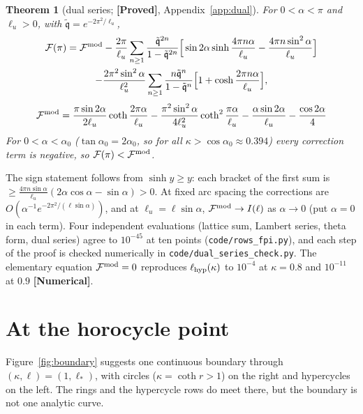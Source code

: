 \documentclass[11pt]{article}
\newtheorem{theorem}{Theorem}[section]
\theoremstyle{definition}
\theoremstyle{remark}
\newcommand{\st}[1]{\textbf{[#1]}}
\begin{document}
\begin{theorem}[dual series; \st{Proved}, Appendix~\ref{app:dual}]\label{thm:dual}
For $0<\alpha<\pi$ and $\ell_u>0$, with $\tilde{\mathfrak q}=e^{-2\pi^2/\ell_u}$,
\begin{multline*}
\mathcal F(\pi)=\mathcal F^{\rm mod}-\frac{2\pi}{\ell_u}\sum_{n\ge1}\frac{\tilde{\mathfrak q}^{2n}}{1-\tilde{\mathfrak q}^{2n}}\Big[\sin2\alpha\sinh\frac{4\pi n\alpha}{\ell_u}-\frac{4\pi n\sin^2\alpha}{\ell_u}\Big]\\
-\frac{2\pi^2\sin^2\alpha}{\ell_u^2}\sum_{n\ge1}\frac{n\tilde{\mathfrak q}^n}{1-\tilde{\mathfrak q}^n}\Big[1+\cosh\frac{2\pi n\alpha}{\ell_u}\Big],
\end{multline*}
\[
\mathcal F^{\rm mod}=\frac{\pi\sin2\alpha}{2\ell_u}\coth\frac{2\pi\alpha}{\ell_u}-\frac{\pi^2\sin^2\alpha}{4\ell_u^2}\coth^2\frac{\pi\alpha}{\ell_u}-\frac{\alpha\sin2\alpha}{\ell_u}-\frac{\cos2\alpha}4
\]
For $0<\alpha<\alpha_0$ ($\tan\alpha_0=2\alpha_0$, so for all $\kappa>\cos\alpha_0\approx0.394$) every correction term is negative,
so $\mathcal F(\pi)<\mathcal F^{\rm mod}$.
\end{theorem}
The sign statement follows from $\sinh y\ge y$: each bracket of the first sum is $\ge\frac{4\pi n\sin\alpha}{\ell_u}(2\alpha\cos\alpha-\sin\alpha)>0$.
At fixed arc spacing the corrections are $O(\alpha^{-1}e^{-2\pi^2/(\ell\sin\alpha)})$, and at $\ell_u=\ell\sin\alpha$,
$\mathcal F^{\rm mod}\to I(\ell)$ as $\alpha\to0$ (put $\alpha=0$ in each term). Four independent evaluations (lattice sum, Lambert
series, theta form, dual series) agree to $10^{-45}$ at ten points (\nolinkurl{code/rows_fpi.py}), and each step of the proof is checked
numerically in \nolinkurl{code/dual_series_check.py}. The elementary equation $\mathcal F^{\rm mod}=0$ reproduces $\ell_{\rm hyp}(\kappa)$
to $10^{-4}$ at $\kappa=0.8$ and $10^{-11}$ at $0.9$ \st{Numerical}.

\section{At the horocycle point}\label{sec:corner}

Figure~\ref{fig:boundary} suggests one continuous boundary through $(\kappa,\ell)=(1,\ell_*)$, with circles ($\kappa=\coth r>1$) on the
right and hypercycles on the left. The rings and the hypercycle rows do meet there, but the boundary is not one analytic curve.
\end{document}

